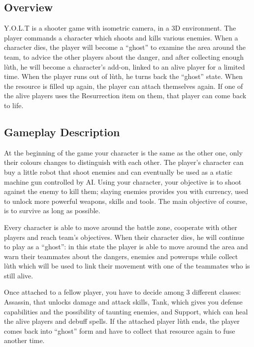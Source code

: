 \documentclass[12pt]{article}
\begin{document}
\subsection{Overview}

Y.O.L.T is a shooter game with isometric camera, in a 3D environment. The player commands a character which shoots and kills various enemies. When a character dies, the player will become a “ghost” to examine the area around the team, to advice the other players about the danger, and after collecting enough lùth, he will become a character’s add-on, linked to an alive player for a limited time. When the player runs out of lùth, he turns back the “ghost” state. When the resource is filled up again, the player can attach themselves again. If one of the alive players uses the Resurrection item on them, that player can come back to life.

\subsection{Gameplay Description}

At the beginning of the game your character is the same as the other one, only their colours changes to distinguish with each other. The player’s character can buy a little robot that shoot enemies and can eventually be used as a static machine gun controlled by AI. Using your character, your objective is to shoot against the enemy to kill them; slaying enemies provides you with currency, used to unlock more powerful weapons, skills and tools. The main objective of course, is to survive as long as possible.

Every character is able to move around the battle zone, cooperate with other players and reach team’s objectives. When their character dies, he will continue to play as a “ghost”: in this state the player is able to move around the area and warn their teammates about the dangers, enemies and powerups while collect lùth which will be used to link their movement with one of the teammates who is still alive.

Once attached to a fellow player, you have to decide among 3 different classes: Assassin, that unlocks damage and attack skills, Tank, which gives you defense capabilities and the possibility of taunting enemies, and Support, which can heal the alive players and debuff spells. If the attached player lùth ends, the player comes back into “ghost” form and have to collect that resource again to fuse another time.
\end{document}
